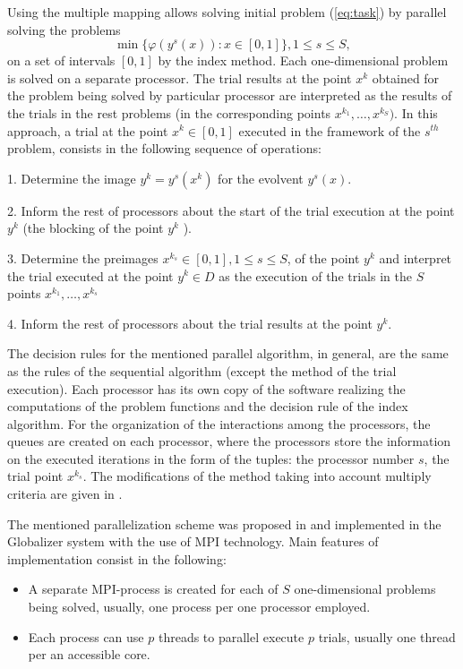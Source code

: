 \documentclass{svproc}
\begin{document}
Using the multiple mapping allows solving initial problem (\ref{eq:task}) by parallel solving the
problems
\[
\min\{\varphi(y^s(x)):x\in [0,1]\}, 1\leq s\leq S,
\]
on a set of intervals $[0,1]$ by the index method. Each one-dimensional problem is solved on a
separate processor. The trial results at the point \(x^k\) obtained for the problem being solved by
particular processor are interpreted as the results of the trials in the rest problems (in the
corresponding points \(x^{k_1},\dots,x^{k_S})\). In this approach, a trial at the point \(x^k \in
[0,1]\) executed in the framework of the \(s^{th}\) problem, consists in the following sequence
of
operations:
\par
1. Determine the image \(y^k=y^s (x^k)\) for the evolvent \(y^s (x)\).
\par
2. Inform the rest of processors about the start of the trial execution at the point \( y^k\) (the
blocking of the point \(y^k\) ).
\par
3. Determine the preimages \(x{}^{k_s}  \in [0,1], 1\leq s\leq S\), of the point \(y^k\) and
interpret the
trial executed at the point \(y^k \in D \) as the execution of the trials in the \(S\) points
\(x{}^{k_1} ,\dots,x{}^{k_s} \)
\par
4. Inform the rest of processors about the trial results at the point \(y^k\).
\par
The decision rules for the mentioned parallel algorithm, in general, are the same as the rules of the
sequential algorithm (except the method of the trial execution). Each processor has its own copy
of the software realizing the computations of the problem functions and the decision rule of the
index algorithm. For the organization of the interactions among the processors, the queues are
created on each processor, where the processors store the information on the executed iterations
in the form of the tuples: the processor number \(s\), the trial point \(x{}^{k_s}\).
The modifications of the method taking into account multiply criteria are given in \cite{GERGEL2017,Gergel2018}.
\par
The mentioned parallelization scheme was proposed in \cite{Gergel2009} and implemented in the
Globalizer system with the use of MPI technology. Main
features of implementation consist in the following:
\begin{itemize}
  \item A separate MPI-process is created for each
 of \(S\) one-dimensional problems being solved, usually, one process per one processor
 employed.
 \item Each process can use $p$ threads to parallel execute $p$ trials, usually one thread per an
accessible core.
\end{itemize}
\end{document}
